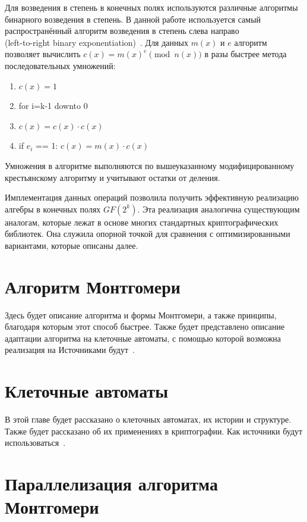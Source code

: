 \documentclass[times,specification,annotation]{itmo-student-thesis}
\begin{document}
Для возведения в степень в конечных полях используются различные алгоритмы бинарного возведения в степень.
В данной работе используется самый распространённый алгоритм возведения в степень слева направо\\
(left-to-right binary exponentiation)~\cite{koc97}.
Для данных $m(x)$ и $e$ алгоритм позволяет вычислить $c(x) = m(x)^e \pmod{n(x)}$ в разы быстрее метода последовательных умножений:
\begin{enumerate}[label=\arabic*:]
    \item $c(x) = 1$
    \item for i=k-1 downto 0
    \item \hspace*{10mm} $c(x) = c(x)\cdot c(x)$
    \item \hspace*{10mm} if $e_i$ == 1: $c(x) = m(x) \cdot c(x)$
\end{enumerate}
Умножения в алгоритме выполняются по вышеуказанному модифицированному крестьянскому алгоритму и учитывают остатки от деления.

Имплементация данных операций позволила получить эффективную реализацию алгебры в конечных полях $GF(2^k)$.
Эта реализация аналогична существующим аналогам, которые лежат в основе многих стандартных криптографических библиотек.
Она служила опорной точкой для сравнения с оптимизированными вариантами, которые описаны далее.


\section{Алгоритм Монтгомери}\label{sec:mont}

Здесь будет описание алгоритма и формы Монтгомери, а также принципы, благодаря которым этот способ быстрее.
Также будет представлено описание адаптации алгоритма на клеточные автоматы, с помощью которой
возможна реализация на
Источниками будут~\cite{jeo07, men01, koc97}.

\section{Клеточные автоматы}\label{sec:cells}

В этой главе будет рассказано о клеточных автоматах, их истории и структуре.
Также будет рассказано об их применениях в криптографии.
Как источники будут использоваться~\cite{zhu17, zhu17_2}.

\section{Параллелизация алгоритма Монтгомери}\label{sec:paramont}
\end{document}
